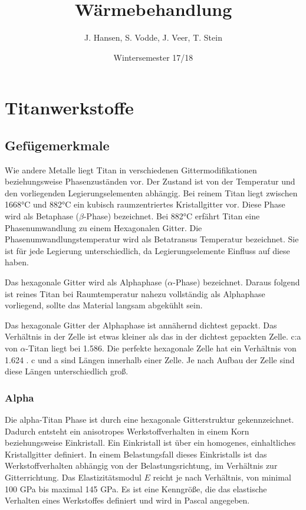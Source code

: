 \documentclass[a4paper, 11pt]{tubsreprt}
\title{Wärmebehandlung}
\date{Wintersemester 17/18}
\author{J. Hansen, S. Vodde,
 J. Veer, T. Stein}
\begin{document}
\maketitle
\tableofcontents
\chapter{Titanwerkstoffe}

\section{Gefügemerkmale}
Wie andere Metalle liegt Titan in verschiedenen Gittermodifikationen beziehungsweise Phasenzuständen vor. Der Zustand ist von der Temperatur und den vorliegenden Legierungselementen abhängig. Bei reinem Titan liegt zwischen 1668°C und 882°C ein kubisch raumzentriertes Kristallgitter vor. Diese Phase wird als Betaphase ($\beta$-Phase) bezeichnet. Bei 882°C erfährt Titan eine Phasenumwandlung zu einem Hexagonalen Gitter. Die Phasenumwandlungstemperatur wird als Betatransus Temperatur bezeichnet. Sie ist für jede Legierung unterschiedlich, da Legierungselemente Einfluss auf diese haben.

Das hexagonale Gitter wird als Alphaphase ($\alpha$-Phase) bezeichnet. Daraus folgend ist reines Titan bei Raumtemperatur nahezu vollständig als Alphaphase vorliegend, sollte das Material langsam abgekühlt sein. 

Das hexagonale Gitter der Alphaphase ist annähernd dichtest gepackt. Das Verhältnis in der Zelle ist etwas kleiner als das in der dichtest gepackten Zelle. c:a von $\alpha$-Titan liegt bei 1.586. Die perfekte hexagonale Zelle hat ein Verhältnis von 1.624 \citep[vgl.]{Siemers2017}. c und a sind Längen innerhalb einer Zelle. Je nach Aufbau der Zelle sind diese Längen unterschiedlich groß. 


\subsection{Alpha}
Die alpha-Titan Phase ist durch eine hexagonale Gitterstruktur gekennzeichnet. Dadurch entsteht ein anisotropes Werkstoffverhalten in einem Korn beziehungsweise Einkristall.
Ein Einkristall ist über ein homogenes, einhaltliches Kristallgitter definiert.
In einem Belastungsfall dieses Einkristalls ist das Werkstoffverhalten abhängig von der Belastungsrichtung, im Verhältnis zur Gitterrichtung. Das Elastizitätsmodul $E$ reicht je nach Verhältnis, von minimal 100 GPa bis maximal 145 GPa. Es ist eine Kenngröße, die das elastische Verhalten eines Werkstoffes definiert und wird in Pascal angegeben. 
\end{document}
